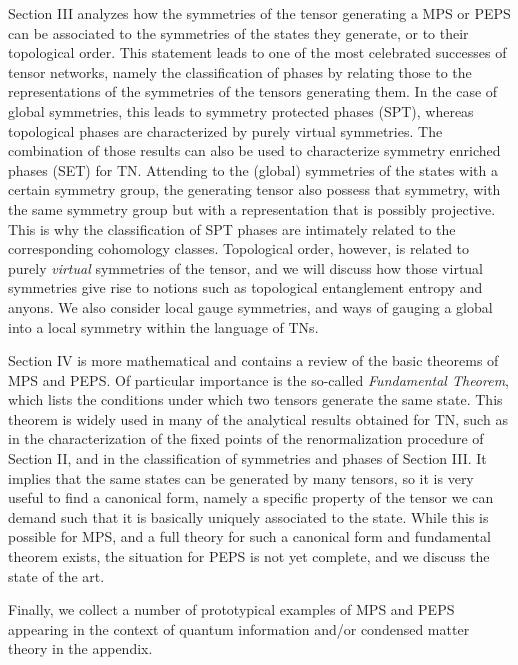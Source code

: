 \documentclass[rmp,aps,reprint,superscriptaddress,nobalancelastpage]{revtex4-1}
\begin{document}
Section III analyzes how the symmetries of the tensor generating a MPS or PEPS can be associated to the symmetries of the states they generate, or to their topological order. This statement leads to one of the most celebrated successes of tensor networks, namely the classification of phases by relating those to the representations of the symmetries of the tensors generating them. In the case of global symmetries, this leads to symmetry protected phases (SPT), whereas topological phases are characterized by purely virtual symmetries. The combination of those results can also be used to characterize symmetry enriched phases (SET) for TN. Attending to the (global) symmetries of the states with a certain symmetry group, the generating tensor also possess that symmetry, with the same symmetry group but with a representation that is possibly projective. This is why the classification of SPT phases are intimately related to the corresponding cohomology classes. Topological order, however, is related to purely \emph{virtual} symmetries of the tensor, and we will discuss how those virtual symmetries give rise to notions such as topological entanglement entropy and anyons. We also consider local gauge symmetries, and ways of gauging a global into a local symmetry within the language of TNs.

Section IV is more mathematical and contains a review of the basic theorems of MPS and PEPS. Of particular importance is the so-called \emph{Fundamental Theorem}, which lists the conditions under which two tensors generate the same state. This theorem is widely used in many of the analytical results obtained  for TN, such as in the characterization of the fixed points of the renormalization procedure of Section II, and  in the classification of symmetries and phases of Section III. It implies that the same states can be generated by many tensors, so it is very useful to find a canonical form, namely a specific property of the tensor we can demand such that it is basically uniquely associated to the state. While this is possible for MPS, and a full theory for such a canonical form and fundamental theorem exists, the situation for PEPS is not yet complete, and we discuss the state of the art.

Finally, we collect a number of prototypical examples of MPS and PEPS appearing in the context of quantum information and/or condensed matter theory in the appendix.
\end{document}
